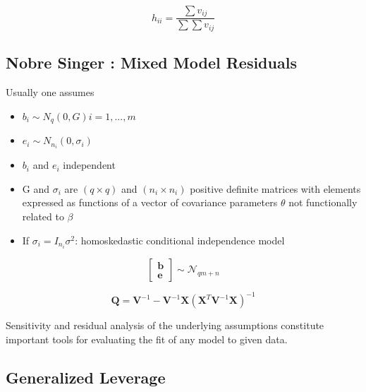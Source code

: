 \documentclass[Main.tex]{subfiles}
\begin{document}
\[ h_{ii} = \frac{\sum v_{ij}}{\sum \sum v_{ij}} \]



\subsection*{Nobre Singer :  Mixed Model Residuals }

Usually one assumes
\begin{itemize}
\item $b_i \sim N_q(0, G) i = 1, ..., m$
\item $e_i  \sim N_{n_i} (0, \sigma_i)$
\item $b_i$ and $e_i$ independent
\item G and $\sigma_i$ are $(q \times q)$ and $(n_i \times n_i)$ positive deﬁnite matrices with
elements expressed as functions of a vector of covariance parameters $\theta$ not functionally related to $\beta$
\item If $\sigma_i = I_{n_i} \sigma^2$: homoskedastic conditional independence model
\end{itemize}

\[  \left[ \begin{array}{c} \boldsymbol{b} \\ \boldsymbol{e} \end{array}\right] \sim \mathcal{N}_{qm+n} \] 


\[ \boldsymbol{Q} = \boldsymbol{V}^{-1} - \boldsymbol{V}^{-1}\boldsymbol{X} ( \boldsymbol{X}^{T} \boldsymbol{V}^{-1} \boldsymbol{X})^{-1} \]


Sensitivity and residual analysis of the underlying assumptions constitute important tools for evaluating the fit of any model to given data.


\subsection*{Generalized Leverage}




%
%
\end{document}
